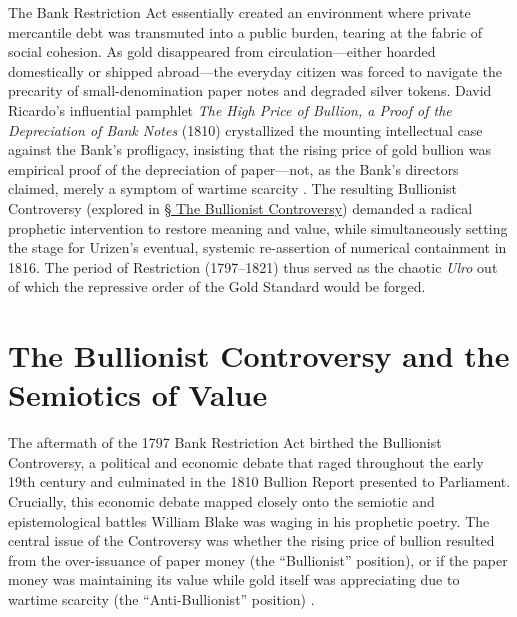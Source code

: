 \documentclass[
]{article}
\begin{document}
The Bank Restriction Act essentially created an environment where
private mercantile debt was transmuted into a public burden, tearing at
the fabric of social cohesion. As gold disappeared from
circulation---either hoarded domestically or shipped abroad---the
everyday citizen was forced to navigate the precarity of
small-denomination paper notes and degraded silver tokens. David
Ricardo's influential pamphlet \emph{The High Price of Bullion, a Proof
of the Depreciation of Bank Notes} (1810) crystallized the mounting
intellectual case against the Bank's profligacy, insisting that the
rising price of gold bullion was empirical proof of the depreciation of
paper---not, as the Bank's directors claimed, merely a symptom of
wartime scarcity \citep{ricardo1810high}. The resulting Bullionist
Controversy (explored in \hyperref[sec-bullionist-controversy]{§ The
Bullionist Controversy}) demanded a radical prophetic intervention to
restore meaning and value, while simultaneously setting the stage for
Urizen's eventual, systemic re-assertion of numerical containment in
1816. The period of Restriction (1797--1821) thus served as the chaotic
\emph{Ulro} out of which the repressive order of the Gold Standard would
be forged.

\newpage

\section{The Bullionist Controversy and the Semiotics of
Value}\label{sec-bullionist-controversy}

The aftermath of the 1797 Bank Restriction Act birthed the Bullionist
Controversy, a political and economic debate that raged throughout the
early 19th century and culminated in the 1810 Bullion Report presented
to Parliament. Crucially, this economic debate mapped closely onto the
semiotic and epistemological battles William Blake was waging in his
prophetic poetry. The central issue of the Controversy was whether the
rising price of bullion resulted from the over-issuance of paper money
(the ``Bullionist'' position), or if the paper money was maintaining its
value while gold itself was appreciating due to wartime scarcity (the
``Anti-Bullionist'' position) \citep{fetter1965development}.
\end{document}

